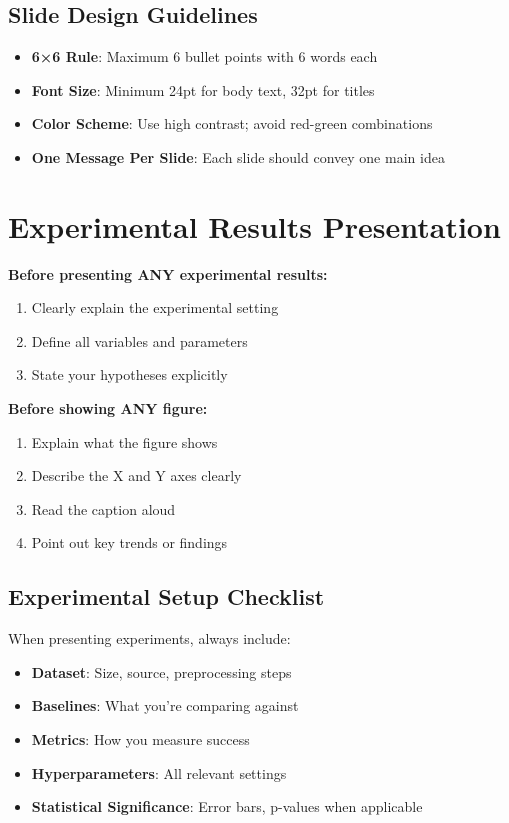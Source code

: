 \documentclass[11pt,a4paper]{article}
\begin{document}
\subsection{Slide Design Guidelines}
\begin{itemize}
    \item \textbf{6×6 Rule}: Maximum 6 bullet points with 6 words each
    \item \textbf{Font Size}: Minimum 24pt for body text, 32pt for titles
    \item \textbf{Color Scheme}: Use high contrast; avoid red-green combinations
    \item \textbf{One Message Per Slide}: Each slide should convey one main idea
\end{itemize}

\section{Experimental Results Presentation}

\begin{tcolorbox}[colback=yellow!10,colframe=red!50,title={Critical Requirements}]
\textbf{Before presenting ANY experimental results:}
\begin{enumerate}
    \item Clearly explain the experimental setting
    \item Define all variables and parameters
    \item State your hypotheses explicitly
\end{enumerate}

\textbf{Before showing ANY figure:}
\begin{enumerate}
    \item Explain what the figure shows
    \item Describe the X and Y axes clearly
    \item Read the caption aloud
    \item Point out key trends or findings
\end{enumerate}
\end{tcolorbox}

\subsection{Experimental Setup Checklist}
When presenting experiments, always include:
\begin{itemize}
    \item \textbf{Dataset}: Size, source, preprocessing steps
    \item \textbf{Baselines}: What you're comparing against
    \item \textbf{Metrics}: How you measure success
    \item \textbf{Hyperparameters}: All relevant settings
    \item \textbf{Statistical Significance}: Error bars, p-values when applicable
\end{itemize}
\end{document}
